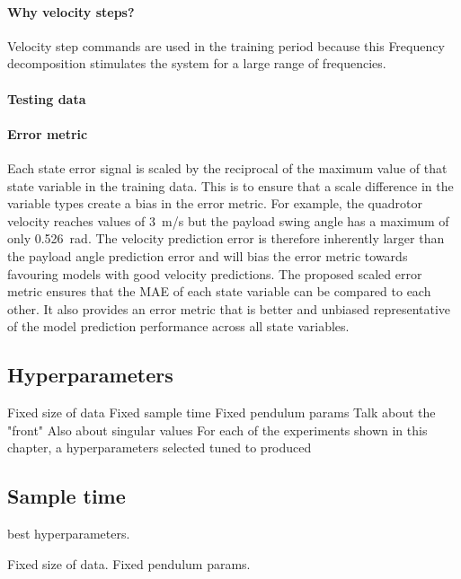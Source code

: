         \paragraph{Why velocity steps?}
        Velocity step commands are used in the training period because this 
        Frequency decomposition stimulates the system for a large range of frequencies.

        \paragraph{Testing data}

        \paragraph{Error metric}
        Each state error signal is scaled by the reciprocal of the maximum value of that state variable in the training data.
        This is to ensure that a scale difference in the variable types create a bias in the error metric.
        For example, the quadrotor velocity reaches values of \SI{3}{\metre/\second} but the payload swing angle has a maximum of only \SI[]{0.526}{\radian}.
        The velocity prediction error is therefore inherently larger than the payload angle prediction error
        and will bias the error metric towards favouring models with good velocity predictions.
        The proposed scaled error metric ensures that the MAE of each state variable can be compared to each other.
        It also provides an error metric that is better and unbiased representative of the model prediction performance across all state variables. 

    \subsection{Hyperparameters}
        Fixed size of data
        Fixed sample time
        Fixed pendulum params
        Talk about the "front"
        Also about singular values
        For each of the experiments shown in this chapter, a hyperparameters selected tuned to produced

    \subsection{Sample time}
        best hyperparameters.
        
        Fixed size of data.
        Fixed pendulum params.

